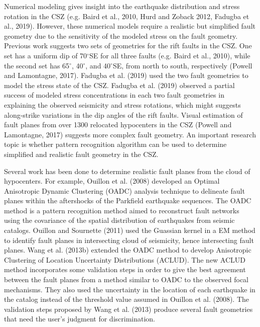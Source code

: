 \documentclass[draft]{agujournal2018}
\begin{document}
Numerical modeling gives insight into the earthquake distribution and stress rotation in the CSZ (e.g. Baird et al., 2010, Hurd and Zoback 2012, Fadugba et al., 2019). However, these numerical models require a realistic but simplified fault geometry due to the sensitivity of the modeled stress on the fault geometry. Previous work suggests two sets of geometries for the rift faults in the CSZ. One set has a uniform dip of 70$^\circ$SE for all three faults (e.g. Baird et al., 2010), while the second set has 65$^\circ$, 40$^\circ$, and 40$^\circ$SE, from north to south, respectively (Powell and Lamontagne, 2017). Fadugba et al. (2019) used the two fault geometries to model the stress state of the CSZ. Fadugba et al. (2019) observed a partial success of modeled stress concentrations in each two fault geometries in explaining the observed seismicity and stress rotations, which might suggests along-strike variations in the dip angles of the rift faults. Visual estimation of fault planes from over 1300 relocated hypocenters in the CSZ (Powell and Lamontagne, 2017) suggests more complex fault geometry. An important research topic is whether pattern recognition algorithm can be used to determine simplified and realistic fault geometry in the CSZ.

Several work has been done to determine realistic fault planes from the cloud of hypocenters. For example, Ouillon et al. (2008) developed an Optimal Anisotropic Dynamic Clustering (OADC) analysis technique  to delineate fault planes within the aftershocks of the Parkfield earthquake sequences. The OADC method is a pattern recognition method aimed to reconstruct fault networks using the covariance of the spatial distribution of earthquakes from seismic catalogs. Ouillon and Sournette (2011) used the Guassian kernel in a EM method to identify fault planes in intersecting cloud of seismicity, hence intersecting fault planes. Wang et al. (2013b) extended the OADC method to develop Anisotropic Clustering of Location Uncertainty Distributions (ACLUD). The new ACLUD method incorporates some validation steps in order to give the best agreement between the fault planes from a method similar to OADC to the observed focal mechanisms. They also used the uncertainty in the location of each earthquake in the catalog instead of the threshold value assumed in Ouillon et al. (2008). The validation steps proposed by Wang et al. (2013) produce several fault geometries that need the user’s judgment for discrimination.
\end{document}
